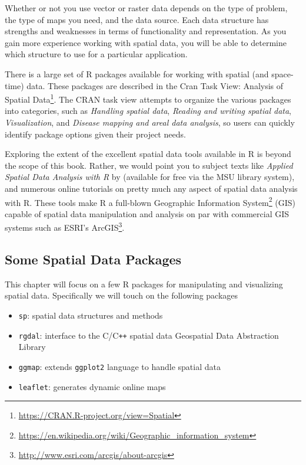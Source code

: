\documentclass[]{krantz}
\providecommand{\tightlist}{%
  \setlength{\itemsep}{0pt}\setlength{\parskip}{0pt}}
\renewcommand{\href}[2]{#2\footnote{\url{#1}}}
\begin{document}
Whether or not you use vector or raster data depends on the type of problem, the type of maps you need, and the data source. Each data structure has strengths and weaknesses in terms of functionality and representation. As you gain more experience working with spatial data, you will be able to determine which structure to use for a particular application.

There is a large set of R packages available for working with spatial (and space-time) data. These packages are described in the \href{https://CRAN.R-project.org/view=Spatial}{Cran Task View: Analysis of Spatial Data}. The CRAN task view attempts to organize the various packages into categories, such as \emph{Handling spatial data}, \emph{Reading and writing spatial data}, \emph{Visualization}, and \emph{Disease mapping and areal data analysis}, so users can quickly identify package options given their project needs.

Exploring the extent of the excellent spatial data tools available in R is beyond the scope of this book. Rather, we would point you to subject texts like \emph{Applied Spatial Data Analysis with R} by \citet{Bivand13} (available for free via the MSU library system), and numerous online tutorials on pretty much any aspect of spatial data analysis with R. These tools make R a full-blown \href{https://en.wikipedia.org/wiki/Geographic_information_system}{Geographic Information System} (GIS) capable of spatial data manipulation and analysis on par with commercial GIS systems such as \href{http://www.esri.com/arcgis/about-arcgis}{ESRI's ArcGIS}.

\hypertarget{some-spatial-data-packages}{%
\subsection{Some Spatial Data Packages}\label{some-spatial-data-packages}}

This chapter will focus on a few R packages for manipulating and visualizing spatial data. Specifically we will touch on the following packages

\begin{itemize}
\tightlist
\item
  \texttt{sp}: spatial data structures and methods
\item
  \texttt{rgdal}: interface to the C/C\texttt{++} spatial data Geospatial Data Abstraction Library
\item
  \texttt{ggmap}: extends \texttt{ggplot2} language to handle spatial data
\item
  \texttt{leaflet}: generates dynamic online maps
\end{itemize}
\end{document}
